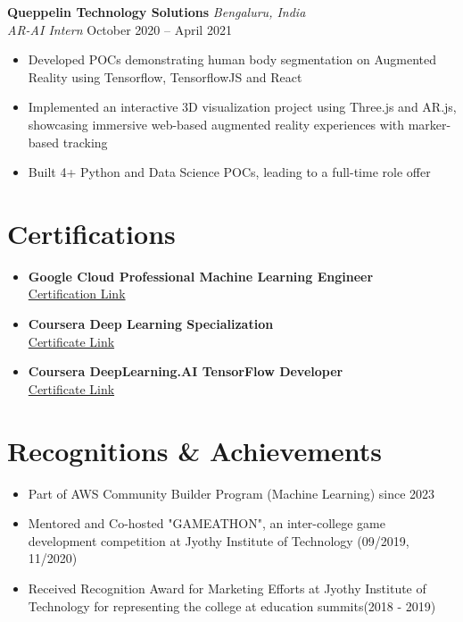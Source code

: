 \documentclass[11pt,a4paper]{article}
\begin{document}
\vspace{0.5em}
\noindent\textbf{Queppelin Technology Solutions} \hfill \textit{Bengaluru, India}\\
\textit{AR-AI Intern} \hfill October 2020 – April 2021
\begin{itemize}[noitemsep,topsep=2pt]
    \item Developed POCs demonstrating human body segmentation on Augmented Reality using Tensorflow, TensorflowJS and React
    \item Implemented an interactive 3D visualization project using Three.js and AR.js, showcasing immersive web-based augmented reality experiences with marker-based tracking
    \item Built 4+ Python and Data Science POCs, leading to a full-time role offer
\end{itemize}
\vspace{-0.5em}

\section*{Certifications}
\begin{itemize}[noitemsep,topsep=2pt]
    \item \textbf{Google Cloud Professional Machine Learning Engineer} \\
    \href{https://google.accredible.com/2d680a48-ff8a-42b7-a018-4f63c9b77030}{Certification Link}
    \item \textbf{Coursera Deep Learning Specialization} \\
    \href{https://www.coursera.org/account/accomplishments/specialization/certificate/VU7R5F8YXV3K}{Certificate Link}
    \item \textbf{Coursera DeepLearning.AI TensorFlow Developer} \\
    \href{https://www.coursera.org/account/accomplishments/specialization/certificate/XEV648B4FRQ3}{Certificate Link}
\end{itemize}
\vspace{-0.5em}

\section*{Recognitions \& Achievements}
\begin{itemize}[noitemsep,topsep=2pt]
    \item Part of AWS Community Builder Program (Machine Learning) since 2023
    \item Mentored and Co-hosted "GAMEATHON", an inter-college game development competition at Jyothy Institute of Technology (09/2019, 11/2020)
    \item Received Recognition Award for Marketing Efforts at Jyothy Institute of Technology for representing the college at education summits(2018 - 2019)
\end{itemize}
\end{document}
